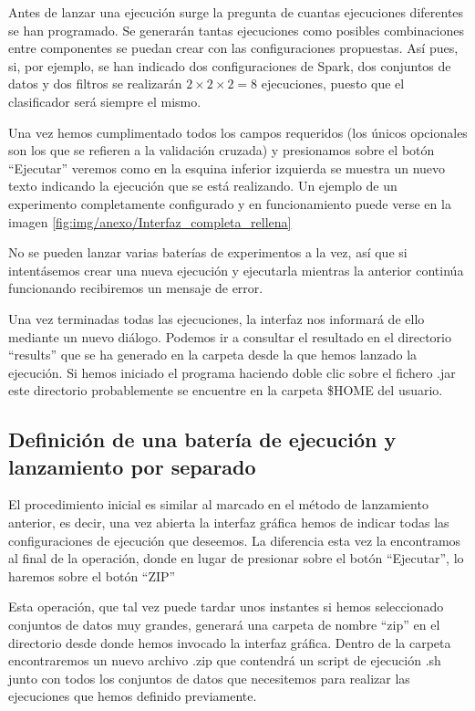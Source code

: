 Antes de lanzar una ejecución surge la pregunta de cuantas ejecuciones diferentes se han programado. Se generarán tantas ejecuciones como posibles combinaciones entre componentes se puedan crear con las configuraciones propuestas. Así pues, si, por ejemplo, se han indicado dos configuraciones de Spark, dos conjuntos de datos y dos filtros se realizarán $2 \times 2 \times 2 = 8$ ejecuciones, puesto que el clasificador será siempre el mismo.
	
Una vez hemos cumplimentado todos los campos requeridos (los únicos opcionales son los que se refieren a la validación cruzada) y presionamos sobre el botón ``Ejecutar'' veremos como en la esquina inferior izquierda se muestra un nuevo texto indicando la ejecución que se está realizando. Un ejemplo de un experimento completamente configurado y en funcionamiento puede verse en la imagen \ref{fig:img/anexo/Interfaz_completa_rellena}


No se pueden lanzar varias baterías de experimentos a la vez, así que si intentásemos crear una nueva ejecución y ejecutarla mientras la anterior continúa funcionando recibiremos un mensaje de error.

Una vez terminadas todas las ejecuciones, la interfaz nos informará de ello mediante un nuevo diálogo. Podemos ir a consultar el resultado en el directorio ``results'' que se ha generado en la carpeta desde la que hemos lanzado la ejecución. Si hemos iniciado el programa haciendo doble clic sobre el fichero .jar este directorio probablemente se encuentre en la carpeta \$HOME del usuario.

\subsection{Definición de una batería de ejecución y lanzamiento por separado}\label{subsec:createZip}

El procedimiento inicial es similar al marcado en el método de lanzamiento anterior, es decir, una vez abierta la interfaz gráfica hemos de indicar todas las configuraciones de ejecución que deseemos. La diferencia esta vez la encontramos al final de la operación, donde en lugar de presionar sobre el botón ``Ejecutar'', lo haremos sobre el botón ``ZIP''

Esta operación, que tal vez puede tardar unos instantes si hemos seleccionado conjuntos de datos muy grandes, generará una carpeta de nombre ``zip'' en el directorio desde donde hemos invocado la interfaz gráfica. Dentro de la carpeta encontraremos un nuevo archivo .zip que contendrá un script de ejecución .sh junto con todos los conjuntos de datos que necesitemos para realizar las ejecuciones que hemos definido previamente.

